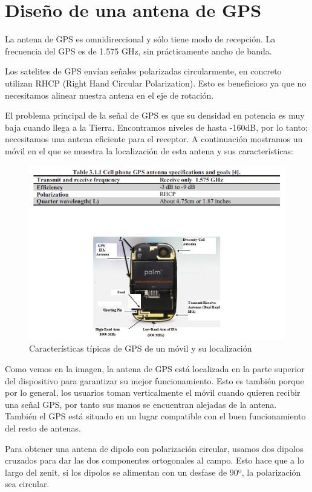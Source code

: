 \documentclass[a4paper,11pt,titlepage]{article}
\begin{document}
\section{Diseño de una antena de GPS}
La antena de GPS es omnidireccional y sólo tiene modo de recepción. La frecuencia del GPS es de 1.575 GHz, sin prácticamente ancho de banda.\par
Los satelites de GPS envían señales polarizadas circularmente, en concreto utilizan RHCP (Right Hand Circular Polarization). Esto es beneficioso ya que no necesitamos alinear nuestra antena en el eje de rotación.\par 
El problema principal de la señal de GPS es que su densidad en potencia es muy baja cuando llega a la Tierra. Encontramos niveles de hasta -160dB, por lo tanto; necesitamos una antena eficiente para el receptor. A continuación mostramos un móvil en el que se muestra la localización de esta antena y sus características:
\begin{figure}[H]
\centering
\includegraphics[width=1.1\textwidth]{movilgps}
\caption{Características típicas de GPS de un móvil y su localización}
\end{figure}
Como vemos en la imagen, la antena de GPS está localizada en la parte superior del dispositivo para garantizar su mejor funcionamiento. Esto es también porque por lo general, los usuarios toman verticalmente el móvil cuando quieren recibir una señal GPS, por tanto sus manos se encuentran alejadas de la antena. También el GPS está situado en un lugar compatible con el buen funcionamiento del resto de antenas.\par 
Para obtener una antena de dipolo con polarización circular, usamos dos dipolos cruzados para dar las dos componentes ortogonales al campo. Esto hace que a lo largo del zenit, si los dipolos se alimentan con un desfase de 90º, la polarización sea circular.
\end{document}
